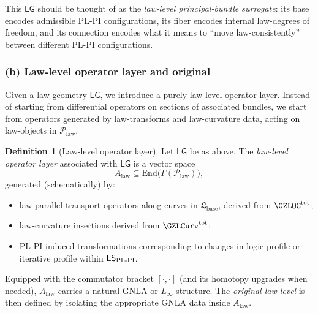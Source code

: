 \documentclass[11pt]{book}
\theoremstyle{plain}
\theoremstyle{definition}
\newtheorem{definition}[theorem]{Definition} \theoremstyle{remark}
\begin{document}
This $\mathsf{LG}$ should be thought of as the \emph{law-level
principal-bundle surrogate}: its base encodes admissible PL-PI
configurations, its fiber encodes internal law-degrees of freedom, and
its connection encodes what it means to “move law-consistently” between
different PL-PI configurations.



\subsubsection*{(b) Law-level operator layer and original \GAlgebra}

Given a law-geometry $\mathsf{LG}$, we introduce a purely law-level
operator layer. Instead of starting from differential operators on
sections of associated bundles, we start from operators generated by
law-transforms and law-curvature data, acting on law-objects in
$\mathcal{P}_{\mathrm{law}}$.

\begin{definition}[Law-level operator layer]
Let $\mathsf{LG}$ be as above. The \emph{law-level operator layer}
  associated with $\mathsf{LG}$ is a vector space
  \[
     A_{\mathrm{law}}
     \subseteq
     \mathrm{End}\bigl(
       \Gamma(\mathcal{P}_{\mathrm{law}})
     \bigr),
  \]
  generated (schematically) by:
  \begin{itemize}
    \item law-parallel-transport operators along curves in
          $\mathfrak{L}_{\mathrm{base}}$, derived from
          $\GZLOC^{\mathrm{tot}}$;
    \item law-curvature insertions derived from
          $\GZLCurv^{\mathrm{tot}}$;
    \item PL-PI induced transformations corresponding to changes in
          logic profile or iterative profile within
          $\mathsf{LS}_{\mathrm{PL\text- PI}}$.
  \end{itemize}
\end{definition}

Equipped with the commutator bracket $[\cdot,\cdot]$ (and its homotopy
upgrades when needed), $A_{\mathrm{law}}$ carries a natural GNLA or
$L_\infty$ structure. The \emph{original law-level \GAlgebra} is then
defined by isolating the appropriate GNLA data inside $A_{\mathrm{law}}$.
\end{document}
